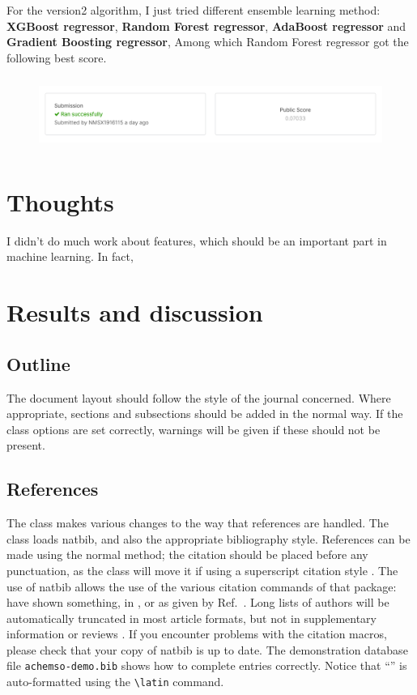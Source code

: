 \documentclass[journal=jacsat,manuscript=article]{achemso}
\begin{document}
For the version2 algorithm, I just tried different ensemble learning method:
\textbf{XGBoost regressor}, \textbf{Random Forest regressor}, \textbf{AdaBoost regressor}
and \textbf{Gradient Boosting regressor}, Among which Random Forest regressor 
got the following best score.

\begin{figure}
  \includegraphics[height=2.4cm]{img/res-version-2.png}
\end{figure}


\section{Thoughts}

I didn't do much work about features, which should be an important part in machine learning.
In fact, 



\section{Results and discussion}

\subsection{Outline}

The document layout should follow the style of the journal concerned.
Where appropriate, sections and subsections should be added in the
normal way. If the class options are set correctly, warnings will be
given if these should not be present.

\subsection{References}

The class makes various changes to the way that references are
handled.  The class loads \textsf{natbib}, and also the
appropriate bibliography style.  References can be made using
the normal method; the citation should be placed before any
punctuation, as the class will move it if using a superscript
citation style
\cite{Mena2000,Abernethy2003,Friedman-Hill2003,EuropeanCommission2008}.
The use of \textsf{natbib} allows the use of the various citation
commands of that package: \citeauthor{Abernethy2003} have shown
something, in \citeyear{Cotton1999}, or as given by
Ref.~.  Long lists of authors will be
automatically truncated in most article formats, but not in
supplementary information or reviews \cite{Pople2003}. If you
encounter problems with the citation macros, please check that
your copy of \textsf{natbib} is up to date. The demonstration
database file \texttt{achemso-demo.bib} shows how to complete
entries correctly. Notice that ``'' is auto-formatted
using the \texttt{\textbackslash latin} command.
\end{document}
